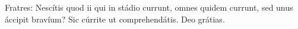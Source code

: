 Fratres: Nescítis quod ii qui in stádio currunt, omnes quidem currunt, sed unus áccipit bravíum? Sic cúrrite ut comprehendátis. \rubric{\Rbar} Deo grátias.
